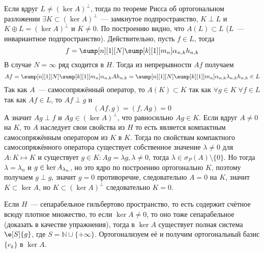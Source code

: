 \documentclass[14pt]{extarticle}
\begin{document}
\begin{Proof}
    Если вдруг $L \ne (\ker A)^\perp$, тогда по теореме Рисса об ортогональном 
    разложении $\exists K \subset (\ker A)^\perp$~--- замкнутое подпространство,
    $K \perp L$ и $K \oplus L = (\ker A)^\perp$ и $K \ne 0$.
    По построению видно, что $A(L) \subset L$ ($L$~--- инвариантное
    подпространство).
    Действительно, пусть $f \in L$, тогда
    $$
    f = \sump[n][1][N] \sump[k][1][m_n] \alpha_{n,k} h_{n, k}
    $$
    В случае $N = \infty$  ряд сходится в $H$.
    Тогда из непрерывности $Af$ получаем
    $$
    Af = \sump[n][1][N] \sump[k][1][m_n] \alpha_{n,k} A h_{n, k} =
    \sump[n][1][N] \sump[k][1][m_n] \alpha_{n,k} \lambda_{n, k} h_{n, k} \in L
    $$
    Так как $A$~--- самосопряжённый оператор, то $A(K) \subset K$ так как
    $\forall g \in K\;\forall f \in L$ так как $Af \in L$, то $Af \perp g$ и
    $$
    (Af, g) = (f, Ag) = 0
    $$
    А значит $Ag \perp f$ и $Ag \in (\ker A)^\perp$, что равносильно $Ag \in K$.
    Если вдруг $A \ne 0$ на $K$, то $A$ наследует свои свойства из $H$ то есть
    является компактным самосопряжённым оператором из $K$ в $K$.
    Тогда по свойствам компактного самосопряжённого оператора существует
    собственное значение $\lambda \neq 0$ для $A : K \mapsto K$ и
    существует $g \in K\colon Ag = \lambda g, \lambda \ne 0$, тогда 
    $\lambda \in \sigma_P(A)\setminus\{0\}$.
    Но тогда $\lambda = \lambda_n$ и $g \in \ker \Al[n]$, но это ядро по 
    построению ортогонально $K$, поэтому получаем $g \perp g$, значит
    $g = 0$ противоречие, следовательно $A = 0$ на $K$, значит
    $K \subset \ker A$, но $K \subset (\ker A)^\perp$ следовательно $K = 0$.
\end{Proof}

Если $H$~--- сепарабельное гильбертово пространство, то есть содержит
счётное всюду плотное множество, то если $\ker A \ne 0$, то оно тоже
сепарабельное (доказать в качестве упражнения), тогда в $\ker A$ существует
полная система $\e[S]{g}$, где $S = \mathbb N \cup \{+\infty\}$.
Ортогонализуем её и получим ортогональный базис $\{e_k\}$ в $\ker A$.
\end{document}
